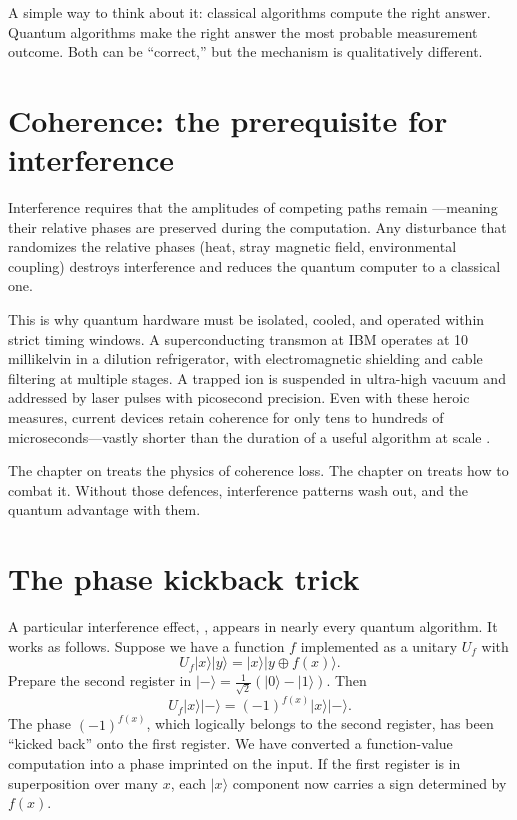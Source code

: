 \begin{remark}
A simple way to think about it: classical algorithms compute the right answer. Quantum algorithms make the right answer the most probable measurement outcome. Both can be ``correct,'' but the mechanism is qualitatively different.
\end{remark}

\section{Coherence: the prerequisite for interference}

Interference requires that the amplitudes of competing paths remain ---meaning their relative phases are preserved during the computation. Any disturbance that randomizes the relative phases (heat, stray magnetic field, environmental coupling) destroys interference and reduces the quantum computer to a classical one.

This is why quantum hardware must be isolated, cooled, and operated within strict timing windows. A superconducting transmon at IBM operates at 10 millikelvin in a dilution refrigerator, with electromagnetic shielding and cable filtering at multiple stages. A trapped ion is suspended in ultra-high vacuum and addressed by laser pulses with picosecond precision. Even with these heroic measures, current devices retain coherence for only tens to hundreds of microseconds---vastly shorter than the duration of a useful algorithm at scale \citep{preskill_quantum_2018}.

The chapter on  treats the physics of coherence loss. The chapter on  treats how to combat it. Without those defences, interference patterns wash out, and the quantum advantage with them.

\section{The phase kickback trick}

A particular interference effect, , appears in nearly every quantum algorithm. It works as follows. Suppose we have a function $f$ implemented as a unitary $U_f$ with
\[
  U_f|x\rangle|y\rangle = |x\rangle|y \oplus f(x)\rangle.
\]
Prepare the second register in $|-\rangle = \tfrac{1}{\sqrt 2}(|0\rangle - |1\rangle)$. Then
\[
  U_f|x\rangle|-\rangle = (-1)^{f(x)}|x\rangle|-\rangle.
\]
The phase $(-1)^{f(x)}$, which logically belongs to the second register, has been ``kicked back'' onto the first register. We have converted a function-value computation into a phase imprinted on the input. If the first register is in superposition over many $x$, each $|x\rangle$ component now carries a sign determined by $f(x)$.

